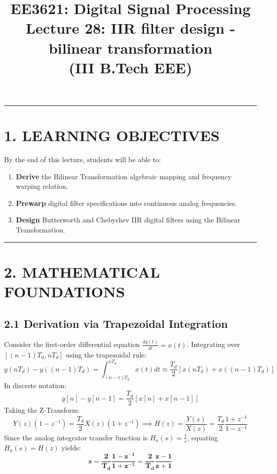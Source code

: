 \documentclass[11pt,a4paper]{article}
\begin{document}
\title{\textbf{EE3621: Digital Signal Processing} \\ \Large Lecture 28: IIR filter design - bilinear transformation \\ \large (III B.Tech EEE)}\maketitle

\noindent\rule{\textwidth}{0.5pt}
\section*{1. LEARNING OBJECTIVES}
By the end of this lecture, students will be able to:
\begin{enumerate}
\item \textbf{Derive} the Bilinear Transformation algebraic mapping and frequency warping relation.
\item \textbf{Prewarp} digital filter specifications into continuous analog frequencies.
\item \textbf{Design} Butterworth and Chebyshev IIR digital filters using the Bilinear Transformation.
\end{enumerate}

\noindent\rule{\textwidth}{0.5pt}
\section*{2. MATHEMATICAL FOUNDATIONS}

\subsection*{2.1 Derivation via Trapezoidal Integration}
Consider the first-order differential equation $\frac{dy(t)}{dt} = x(t)$. Integrating over $[(n-1)T_d, n T_d]$ using the trapezoidal rule:
$$ y(n T_d) - y((n-1)T_d) = \int_{(n-1)T_d}^{n T_d} x(t) dt \approx \frac{T_d}{2} [x(n T_d) + x((n-1)T_d)] $$
In discrete notation:
$$ y[n] - y[n-1] = \frac{T_d}{2} [x[n] + x[n-1]] $$
Taking the Z-Transform:
$$ Y(z)(1 - z^{-1}) = \frac{T_d}{2} X(z)(1 + z^{-1}) \implies H(z) = \frac{Y(z)}{X(z)} = \frac{T_d}{2} \frac{1 + z^{-1}}{1 - z^{-1}} $$
Since the analog integrator transfer function is $H_a(s) = \frac{1}{s}$, equating $H_a(s) = H(z)$ yields:
$$ \mathbf{s = \frac{2}{T_d} \frac{1 - z^{-1}}{1 + z^{-1}} = \frac{2}{T_d} \frac{z - 1}{z + 1}} $$
\end{document}
